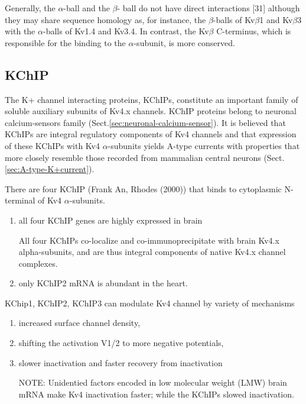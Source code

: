 Generally, the $\alpha$-ball and the $\beta$-
ball do not have direct interactions [31] although they may share
sequence homology as, for instance, the $\beta$-balls of Kv$\beta$1 and Kv$\beta$3
with the $\alpha$-balls of Kv1.4 and Kv3.4. In contrast, the Kv$\beta$ C-terminus,
which is responsible for the binding to the  $\alpha$-subunit, is
more conserved.

\subsection{KChIP}
\label{sec:KChIP}

The K+ channel interacting proteins, KChIPs, constitute an important family of
soluble auxiliary subunits of Kv4.x channels. KChIP proteins belong to neuronal
calcium-sensors family (Sect.\ref{sec:neuronal-calcium-sensor}).
It is believed that KChIPs are integral regulatory components of Kv4 channels
and that expression of these KChIPs with Kv4 $\alpha$-subunits yields A-type
currents with properties that more closely resemble those recorded from
mammalian central neurons (Sect.\ref{sec:A-type-K+current}).

There are four KChIP (Frank An, Rhodes (2000)) that binds to cytoplasmic
N-terminal of Kv4 $\alpha$-subunits. 
\begin{enumerate}
  \item all four KChIP genes are highly expressed in brain

All four KChIPs co-localize and co-immunoprecipitate with brain Kv4.x
alpha-subunits, and are thus integral components of native Kv4.x channel
complexes.

  \item only KChIP2 mRNA is abundant in the heart.
\end{enumerate}

KChip1, KChIP2, KChIP3  can modulate Kv4 channel by variety of mechanisms
\begin{enumerate}
  \item  increased surface channel density, 
  
  \item shifting the activation V1/2 to more negative potentials, 
  
  \item slower inactivation and faster recovery from inactivation
  
NOTE: Unidentied factors encoded in low molecular weight (LMW) brain mRNA make
Kv4 inactivation faster; while the KChIPs slowed inactivation.
\end{enumerate}

